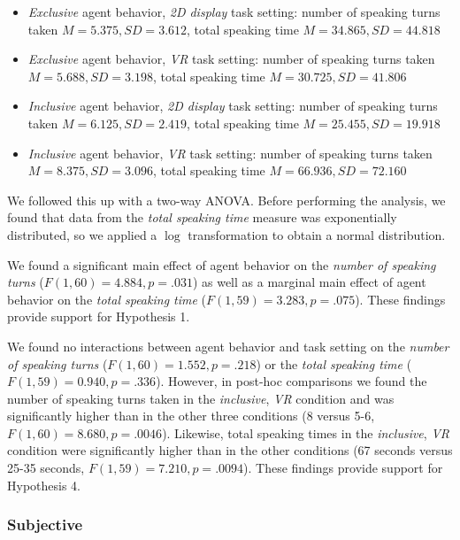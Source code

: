 \begin{itemize}
\item \emph{Exclusive} agent behavior, \emph{2D display} task setting: number of speaking turns taken $M = 5.375, SD = 3.612$, total speaking time $M = 34.865, SD = 44.818$
\item \emph{Exclusive} agent behavior, \emph{VR} task setting: number of speaking turns taken $M = 5.688, SD = 3.198$, total speaking time $M = 30.725, SD = 41.806$
\item \emph{Inclusive} agent behavior, \emph{2D display} task setting: number of speaking turns taken $M = 6.125, SD = 2.419$, total speaking time $M = 25.455, SD = 19.918$
\item \emph{Inclusive} agent behavior, \emph{VR} task setting: number of speaking turns taken $M = 8.375, SD = 3.096$, total speaking time $M = 66.936, SD = 72.160$
\end{itemize}

We followed this up with a two-way ANOVA. Before performing the analysis, we found that data from the \emph{total speaking time} measure was exponentially distributed, so we applied a $\log$ transformation to obtain a normal distribution.

We found a significant main effect of agent behavior on the \emph{number of speaking turns} ($F(1, 60) = 4.884, p = .031$) as well as a marginal main effect of agent behavior on the \emph{total speaking time} ($F(1, 59) = 3.283, p = .075$). These findings provide support for Hypothesis 1.

We found no interactions between agent behavior and task setting on the \emph{number of speaking turns} ($F(1, 60) = 1.552, p = .218$) or the \emph{total speaking time} ($F(1, 59) = 0.940, p = .336$). However, in post-hoc comparisons we found the number of speaking turns taken in the \emph{inclusive}, \emph{VR} condition and was significantly higher than in the other three conditions (8 versus 5-6, $F(1, 60) = 8.680, p = .0046$). Likewise, total speaking times in the \emph{inclusive}, \emph{VR} condition were significantly higher than in the other conditions (67 seconds versus 25-35 seconds, $F(1, 59) = 7.210, p = .0094$). These findings provide support for Hypothesis 4.

\subsubsection{Subjective}

